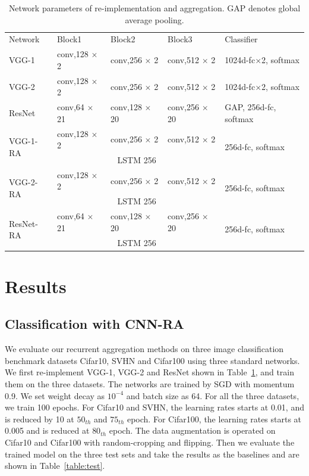 \documentclass[runningheads]{llncs}
\begin{document}
\setlength{\tabcolsep}{4pt}
\linespread{1.2}
\begin{table}
\begin{center}
\caption{
Network parameters of re-implementation and aggregation. GAP denotes global average pooling.
}
\label{table:struc}
\begin{tabular}{l|l|l|l|l}
\hline\noalign{\smallskip}
Network& Block1 & Block2 & Block3 & Classifier\\
\noalign{\smallskip}
\hline
\noalign{\smallskip}
VGG-1 & conv,128 $\times$ 2 & conv,256 $\times$ 2 & conv,512 $\times$ 2 & 1024d-fc$\times$2, softmax \\
\hline
VGG-2 & conv,128 $\times$ 2 & conv,256 $\times$ 2 & conv,512 $\times$ 2 & 1024d-fc$\times$2, softmax \\
\hline
ResNet & conv,64 $\times$ 21 & conv,128 $\times$ 20 & conv,256 $\times$ 20 & GAP, 256d-fc, softmax \\
\hline
\multirow{2}{*}{VGG-1-RA} & conv,128 $\times$ 2 & conv,256 $\times$ 2 & conv,512 $\times$ 2 & \multirow{2}{3cm}{256d-fc, softmax} \\
\cline{2-4}
					 & \multicolumn{3}{c|}{LSTM 256} \\
\hline
\multirow{2}{*}{VGG-2-RA} & conv,128 $\times$ 2 & conv,256 $\times$ 2 & conv,512 $\times$ 2 & \multirow{2}{3cm}{256d-fc, softmax} \\
\cline{2-4}
					 & \multicolumn{3}{c|}{LSTM 256} \\
\hline
\multirow{2}{*}{ResNet-RA} & conv,64 $\times$ 21 & conv,128 $\times$ 20 & conv,256 $\times$ 20 &\multirow{2}{3cm}{256d-fc, softmax} \\
\cline{2-4}
					& \multicolumn{3}{c|}{LSTM 256}\\
\hline
\end{tabular}
\end{center}
\end{table}
\setlength{\tabcolsep}{1.4pt}

\section{Results}

\subsection{Classification with CNN-RA}

We evaluate our recurrent aggregation methods on three image classification benchmark datasets Cifar10, SVHN and Cifar100 using three standard networks. We first re-implement VGG-1, VGG-2 and ResNet shown in Table~\ref{table:struc}, and train them on the three datasets. The networks are trained by SGD with momentum 0.9. We set weight decay as $10^{-4}$ and batch size as 64. For all the three datasets, we train 100 epochs. For Cifar10 and SVHN, the learning rates starts at 0.01, and is reduced by 10 at $50_{th}$ and $75_{th}$ epoch. For Cifar100, the learning rates starts at 0.005 and is reduced at $80_{th}$ epoch. The data augmentation is operated on Cifar10 and Cifar100 with random-cropping and flipping. Then we evaluate the trained model on the three test sets and take the results as the baselines and are shown in Table~\ref{table:test}.
\end{document}
